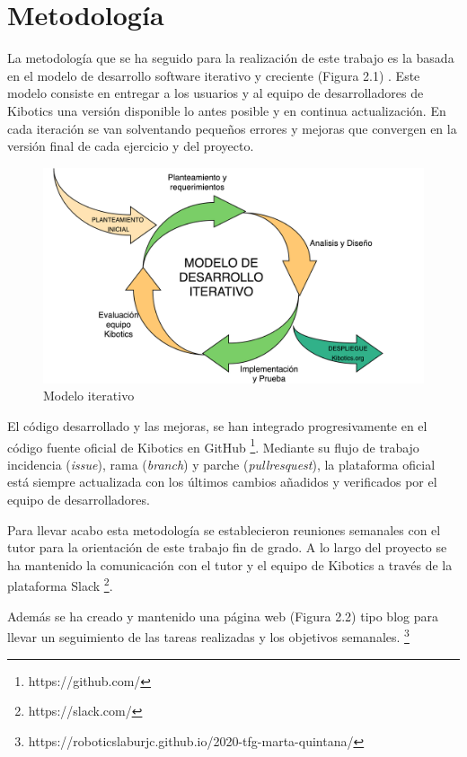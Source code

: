 
\section{Metodología}

La metodología que se ha seguido para la realización de este trabajo es la basada en el modelo de desarrollo software iterativo y creciente (Figura 2.1) \cite{modeloiter}.
Este modelo consiste en entregar a los usuarios y al equipo de desarrolladores de Kibotics una versión disponible lo antes posible y en continua actualización. En cada iteración se van solventando pequeños errores y mejoras que convergen en la versión final de cada ejercicio y del proyecto.

\begin{figure}[H]
    \centering
    \includegraphics[width=0.9\columnwidth]{chapters/images/metodologiaiterativa.png}
    \caption{Modelo iterativo}
    \label{fig:my_label}
\end{figure}


El código desarrollado y las mejoras, se han integrado progresivamente en el código fuente oficial de Kibotics en GitHub \footnote{https://github.com/}. Mediante su flujo de trabajo incidencia (\textit{issue}), rama (\textit{branch}) y parche (\textit{pullresquest}), la plataforma oficial está siempre actualizada con los últimos cambios añadidos y verificados por el equipo de desarrolladores.

Para llevar acabo esta metodología se establecieron reuniones semanales con el tutor para la orientación de este trabajo fin de grado. A lo largo del proyecto se ha mantenido la comunicación con el tutor y el equipo de Kibotics a través de la plataforma Slack \footnote{https://slack.com/}. 



Además se ha creado y mantenido una página web (Figura 2.2) tipo blog para llevar un seguimiento de las tareas realizadas y los objetivos semanales. \footnote{https://roboticslaburjc.github.io/2020-tfg-marta-quintana/}

